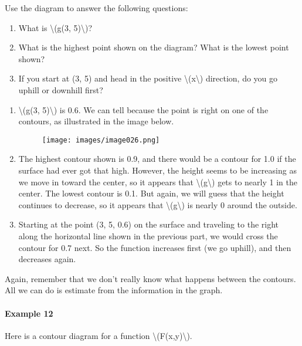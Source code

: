 Use the diagram to answer the following questions:

\begin{enumerate}
\tightlist
\item
  What is \textbackslash{}(g(3, 5)\textbackslash{})?
\item
  What is the highest point shown on the diagram? What is the lowest
  point shown?
\item
  If you start at (3, 5) and head in the positive
  \textbackslash{}(x\textbackslash{}) direction, do you go uphill or
  downhill first?
\end{enumerate}

\begin{enumerate}
\item
  \textbackslash{}(g(3, 5)\textbackslash{}) is 0.6. We can tell because
  the point is right on one of the contours, as illustrated in the image
  below.

  \begin{figure}
  \centering
  \texttt{[image: images/image026.png]}
  \caption{}
  \end{figure}
\item
  The highest contour shown is 0.9, and there would be a contour for 1.0
  if the surface had ever got that high. However, the height seems to be
  increasing as we move in toward the center, so it appears that
  \textbackslash{}(g\textbackslash{}) gets to nearly 1 in the center.
  The lowest contour is 0.1. But again, we will guess that the height
  continues to decrease, so it appears that
  \textbackslash{}(g\textbackslash{}) is nearly 0 around the outside.
\item
  Starting at the point (3, 5, 0.6) on the surface and traveling to the
  right along the horizontal line shown in the previous part, we would
  cross the contour for 0.7 next. So the function increases first (we go
  uphill), and then decreases again.
\end{enumerate}

Again, remember that we don't really know what happens between the
contours. All we can do is estimate from the information in the graph.

\hypertarget{example-12}{%
\paragraph{Example 12}\label{example-12}}

Here is a contour diagram for a function
\textbackslash{}(F(x,y)\textbackslash{}).

